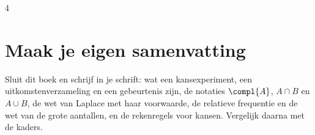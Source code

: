 \begin{oefeningen}

\begin{alleenvoor}{4}
\end{alleenvoor}
\end{oefeningen}


\begin{oefeningen}






\end{oefeningen}


\ifzelfstudie
\section*{Maak je eigen samenvatting}
Sluit dit boek en schrijf in je schrift: wat een kansexperiment, een uitkomstenverzameling en een gebeurtenis zijn, de notaties $\compl{A}$, $A \cap B$ en $A \cup B$, de wet van Laplace met haar voorwaarde, de relatieve frequentie en de wet van de grote aantallen, en de rekenregels voor kansen. Vergelijk daarna met de kaders.
\fi
